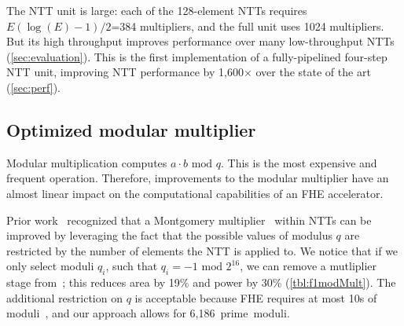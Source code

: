 The NTT unit is large: each of the 128-element NTTs requires $E(\log
(E)-1)/2$=384 multipliers, and the full unit uses 1024 multipliers. But its
high throughput improves performance over many low-throughput NTTs
(\autoref{sec:evaluation}). This is the first implementation of a
fully-pipelined four-step NTT unit, improving NTT performance by 1,600$\times$
over the state of the art (\autoref{sec:perf}).


\subsection{Optimized modular multiplier}\label{sec:modMult}
\tblFOneModMult

Modular multiplication computes $a\cdot b \textrm{ mod } q$. This is the most
expensive and frequent operation. Therefore, improvements to the modular
multiplier have an almost linear impact on the computational capabilities of an
FHE accelerator.

Prior work~\cite{mert:euromicro19:design} recognized that a Montgomery
multiplier~\cite{montgomery:mom85:modular} within NTTs can be improved by
leveraging the fact that the possible values of modulus $q$ are restricted by
the number of elements the NTT is applied to. We notice that if we only select
moduli $q_i$, such that $q_i = -1 \textrm{ mod } 2^{16}$, we can remove a
mutliplier stage from~\cite{mert:euromicro19:design}; this reduces area by 19\%
and power by 30\% (\autoref{tbl:f1modMult}). The additional restriction on $q$
is acceptable because FHE requires at most 10s of
moduli~\cite{gentry:crypto2012:homomorphic}, and our approach allows for
6,186~prime~moduli.

